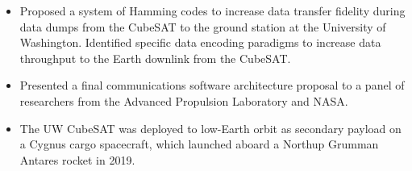 \documentclass[10pt]{article}
\newcommand{\tabularxwidth}{\textwidth}
\begin{document}
\begin{minipage}{\tabularxwidth}
\begin{itemize}[noitemsep, topsep=3pt, parsep=0pt, partopsep=0pt]
                \item 
    Proposed a system of Hamming codes to increase data transfer fidelity during data dumps from the CubeSAT to the ground station at the University of Washington. Identified specific data encoding paradigms to increase data throughput to the Earth downlink from the CubeSAT.
            
                \item 
    Presented a final communications software architecture proposal to a panel of researchers from the Advanced Propulsion Laboratory and NASA.
            
                \item 
    The UW CubeSAT was deployed to low-Earth orbit as secondary payload on a Cygnus cargo spacecraft, which launched aboard a Northup Grumman Antares rocket in 2019.
            
        \end{itemize}

        
            \vspace{.5em}
        

    \end{minipage}
    
\end{document}
